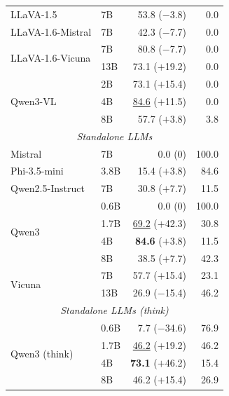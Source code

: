 \begin{table}[ht]
\begin{tabular}{llrr}
LLaVA-1.5 & 7B & \cellcolor{teal!15}53.8 {\scriptsize ($-$3.8)}  & 0.0 \\
LLaVA-1.6-Mistral & 7B & \cellcolor{red!12}42.3 {\scriptsize ($-$7.7)} & 0.0 \\
\multirow[t]{2}{*}{LLaVA-1.6-Vicuna}
 & 7B  & \cellcolor{teal!15}80.8 {\scriptsize ($-$7.7)}   & 0.0 \\
 & 13B & \cellcolor{teal!15}73.1 {\scriptsize ($+$19.2)}  & 0.0 \\
\multirow[t]{3}{*}{Qwen3-VL}
 & 2B  & \cellcolor{teal!15}73.1 {\scriptsize ($+$15.4)}  & 0.0 \\
 & 4B  & \cellcolor{teal!15}\underline{84.6} {\scriptsize ($+$11.5)}  & 0.0 \\
 & 8B  & \cellcolor{teal!15}57.7 {\scriptsize ($+$3.8)}   & 3.8 \\
\midrule
\multicolumn{4}{c}{\textit{Standalone LLMs}} \\
\midrule
Mistral & 7B  & \cellcolor{red!12}0.0 {\scriptsize (0)} & 100.0 \\
Phi-3.5-mini & 3.8B & \cellcolor{red!12}15.4 {\scriptsize ($+$3.8)} & 84.6 \\
Qwen2.5-Instruct & 7B & \cellcolor{red!12}30.8 {\scriptsize ($+$7.7)} & 11.5 \\
\multirow[t]{4}{*}{Qwen3}
 & 0.6B & \cellcolor{red!12}0.0 {\scriptsize (0)}        & 100.0 \\
 & 1.7B & \cellcolor{teal!15}\underline{69.2} {\scriptsize ($+$42.3)} & 30.8 \\
 & 4B   & \cellcolor{teal!15}\textbf{84.6} {\scriptsize ($+$3.8)}  & 11.5 \\
 & 8B   & \cellcolor{red!12}38.5 {\scriptsize ($+$7.7)}  & 42.3 \\
\multirow[t]{2}{*}{Vicuna}
 & 7B  & \cellcolor{teal!15}57.7 {\scriptsize ($+$15.4)} & 23.1 \\
 & 13B & \cellcolor{red!12}26.9 {\scriptsize ($-$15.4)} & 46.2 \\
\midrule
\multicolumn{4}{c}{\textit{Standalone LLMs (think)}} \\
\midrule
\multirow[t]{4}{*}{Qwen3 (think)}
 & 0.6B & \cellcolor{red!12}7.7 {\scriptsize ($-$34.6)}  & 76.9 \\
 & 1.7B & \cellcolor{red!12}\underline{46.2} {\scriptsize ($+$19.2)} & 46.2 \\
 & 4B   & \cellcolor{teal!15}\textbf{73.1} {\scriptsize ($+$46.2)} & 15.4 \\
 & 8B   & \cellcolor{red!12}46.2 {\scriptsize ($+$15.4)} & 26.9 \\
\bottomrule
\end{tabular}
\end{table}
